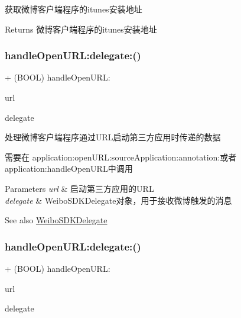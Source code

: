 获取微博客户端程序的itunes安装地址 \begin{DoxyReturn}{Returns}
微博客户端程序的itunes安装地址 
\end{DoxyReturn}
\mbox{\label{interface_weibo_s_d_k_a4a0d371f214612aa4c31ff1096796203}} 
\subsubsection{\texorpdfstring{handle\+Open\+U\+R\+L\+:delegate\+:()}{handleOpenURL:delegate:()}\hspace{0.1cm}{\footnotesize\ttfamily [1/3]}}
{\footnotesize\ttfamily + (B\+O\+OL) handle\+Open\+U\+R\+L\+: \begin{DoxyParamCaption}\item[{(N\+S\+U\+RL $\ast$)}]{url }\item[{delegate:(id$<$ Weibo\+S\+D\+K\+Delegate $>$)}]{delegate }\end{DoxyParamCaption}}

处理微博客户端程序通过\+U\+R\+L启动第三方应用时传递的数据

需要在 application\+:open\+U\+R\+L\+:source\+Application\+:annotation\+:或者application\+:handle\+Open\+U\+R\+L中调用 
\begin{DoxyParams}{Parameters}
{\em url} & 启动第三方应用的\+U\+RL \\
\hline
{\em delegate} & Weibo\+S\+D\+K\+Delegate对象，用于接收微博触发的消息 \\
\hline
\end{DoxyParams}
\begin{DoxySeeAlso}{See also}
\mbox{\hyperlink{class_weibo_s_d_k_delegate-p}{Weibo\+S\+D\+K\+Delegate}} 
\end{DoxySeeAlso}
\mbox{\label{interface_weibo_s_d_k_a4a0d371f214612aa4c31ff1096796203}} 
\subsubsection{\texorpdfstring{handle\+Open\+U\+R\+L\+:delegate\+:()}{handleOpenURL:delegate:()}\hspace{0.1cm}{\footnotesize\ttfamily [2/3]}}
{\footnotesize\ttfamily + (B\+O\+OL) handle\+Open\+U\+R\+L\+: \begin{DoxyParamCaption}\item[{(N\+S\+U\+RL $\ast$)}]{url }\item[{delegate:(id$<$ Weibo\+S\+D\+K\+Delegate $>$)}]{delegate }\end{DoxyParamCaption}}

